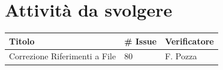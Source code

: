 \documentclass{article}
\begin{document}
\section{Attività da svolgere}
    \begin{center}
        \begin{tabular}{|C{7cm}|C{1,5cm}|C{3cm}|}
            \hline
            \textbf{Titolo} & \textbf{\# Issue} & \textbf{Verificatore} \\
            \hline\hline
            Correzione Riferimenti a File & 80 & F. Pozza \\
            \hline
        \end{tabular}
    \end{center}
\end{document}
